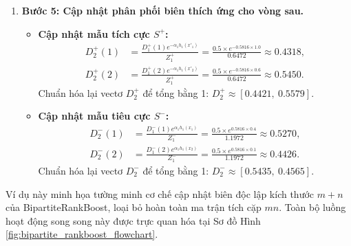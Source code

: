 \begin{example}
\begin{enumerate}
    \item \textbf{Bước 5: Cập nhật phân phối biên thích ứng cho vòng sau.}
    \begin{itemize}
        \item \textbf{Cập nhật mẫu tích cực $S^+$:}
        \begin{align*}
            D^+_2(1) &= \frac{D^+_1(1) e^{-\alpha_1 h_1(x'_1)}}{Z^+_1} = \frac{0.5 \times e^{-0.5816 \times 1.0}}{0.6472} \approx 0.4318, \\
            D^+_2(2) &= \frac{D^+_1(2) e^{-\alpha_1 h_1(x'_2)}}{Z^+_1} = \frac{0.5 \times e^{-0.5816 \times 0.6}}{0.6472} \approx 0.5450.
        \end{align*}
        Chuẩn hóa lại vectơ $D^+_2$ để tổng bằng 1: $D^+_2 \approx [0.4421, \ 0.5579]$.
        
        \item \textbf{Cập nhật mẫu tiêu cực $S^-$:}
        \begin{align*}
            D^-_2(1) &= \frac{D^-_1(1) e^{\alpha_1 h_1(x_1)}}{Z^-_1} = \frac{0.5 \times e^{0.5816 \times 0.4}}{1.1972} \approx 0.5270, \\
            D^-_2(2) &= \frac{D^-_1(2) e^{\alpha_1 h_1(x_2)}}{Z^-_1} = \frac{0.5 \times e^{0.5816 \times 0.1}}{1.1972} \approx 0.4426.
        \end{align*}
        Chuẩn hóa lại vectơ $D^-_2$ để tổng bằng 1: $D^-_2 \approx [0.5435, \ 0.4565]$.
    \end{itemize}
\end{enumerate}
Ví dụ này minh họa tường minh cơ chế cập nhật biên độc lập kích thước $m + n$ của BipartiteRankBoost, loại bỏ hoàn toàn ma trận tích cặp $mn$. Toàn bộ luồng hoạt động song song này được trực quan hóa tại Sơ đồ Hình \ref{fig:bipartite_rankboost_flowchart}.
\end{example}

